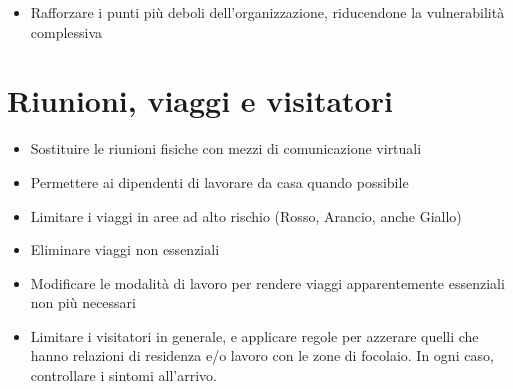 \documentclass[onecolumn,journal]{IEEEtran}
\begin{document}
\begin{multicols}{2}
\begin{itemize}
\item Rafforzare i punti più deboli dell'organizzazione, riducendone la vulnerabilità complessiva
\end{itemize}

\section*{Riunioni, viaggi e visitatori}
\begin{itemize}
\item Sostituire le riunioni fisiche con mezzi di comunicazione virtuali
\item Permettere ai dipendenti di lavorare da casa quando possibile
\item Limitare i viaggi in aree ad alto rischio (Rosso, Arancio, anche Giallo)
\item Eliminare viaggi non essenziali
\item Modificare le modalità di lavoro per rendere viaggi apparentemente essenziali non più necessari
\item Limitare i visitatori in generale, e applicare regole per azzerare quelli che hanno relazioni di residenza e/o lavoro con le zone di focolaio. In ogni caso, controllare i sintomi all'arrivo.
\end{itemize}


\end{multicols}
\end{document}
